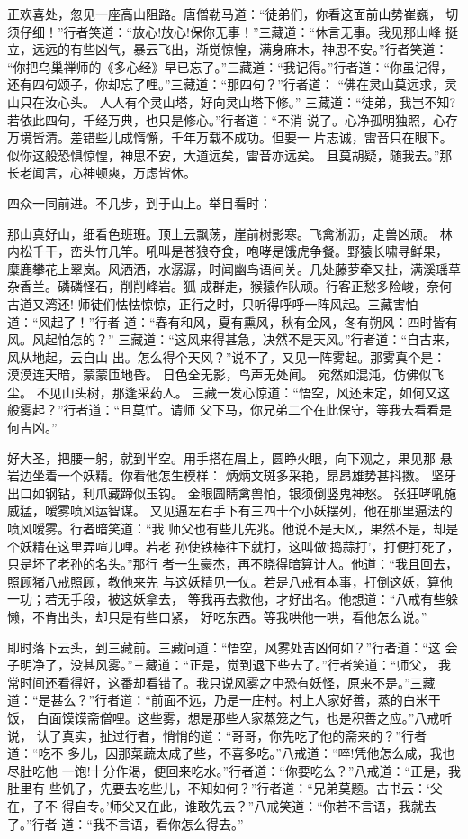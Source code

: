 正欢喜处，忽见一座高山阻路。唐僧勒马道：“徒弟们，你看这面前山势崔巍，
切须仔细！”行者笑道：“放心!放心!保你无事！”三藏道：“休言无事。我见那山峰
挺立，远远的有些凶气，暴云飞出，渐觉惊惶，满身麻木，神思不安。”行者笑道：
“你把乌巢禅师的《多心经》早已忘了。”三藏道：“我记得。”行者道：“你虽记得，
还有四句颂子，你却忘了哩。”三藏道：“那四句？”行者道：
“佛在灵山莫远求，灵山只在汝心头。
人人有个灵山塔，好向灵山塔下修。”
三藏道：“徒弟，我岂不知?若依此四句，千经万典，也只是修心。”行者道：“不消
说了。心净孤明独照，心存万境皆清。差错些儿成惰懈，千年万载不成功。但要一
片志诚，雷音只在眼下。似你这般恐惧惊惶，神思不安，大道远矣，雷音亦远矣。
且莫胡疑，随我去。”那长老闻言，心神顿爽，万虑皆休。

四众一同前进。不几步，到于山上。举目看时：

那山真好山，细看色班班。顶上云飘荡，崖前树影寒。飞禽淅沥，走兽凶顽。
林内松千干，峦头竹几竿。吼叫是苍狼夺食，咆哮是饿虎争餐。野猿长啸寻鲜果，
糜鹿攀花上翠岚。风洒洒，水潺潺，时闻幽鸟语间关。几处藤萝牵又扯，满溪瑶草
杂香兰。磷磷怪石，削削峰岩。狐成群走，猴猿作队顽。行客正愁多险峻，奈何
古道又湾还!
师徒们怯怯惊惊，正行之时，只听得呼呼一阵风起。三藏害怕道：“风起了！”行者
道：“春有和风，夏有熏风，秋有金风，冬有朔风：四时皆有风。风起怕怎的？”
三藏道：“这风来得甚急，决然不是天风。”行者道：“自古来，风从地起，云自山
出。怎么得个天风？”说不了，又见一阵雾起。那雾真个是：
漠漠连天暗，蒙蒙匝地昏。
日色全无影，鸟声无处闻。
宛然如混沌，仿佛似飞尘。
不见山头树，那逢采药人。
三藏一发心惊道：“悟空，风还未定，如何又这般雾起？”行者道：“且莫忙。请师
父下马，你兄弟二个在此保守，等我去看看是何吉凶。”

好大圣，把腰一躬，就到半空。用手搭在眉上，圆睁火眼，向下观之，果见那
悬岩边坐着一个妖精。你看他怎生模样：
炳炳文斑多采艳，昂昂雄势甚抖擞。
坚牙出口如钢钻，利爪藏蹄似玉钩。
金眼圆睛禽兽怕，银须倒竖鬼神愁。
张狂哮吼施威猛，嗳雾喷风运智谋。
又见逼左右手下有三四十个小妖摆列，他在那里逼法的喷风嗳雾。行者暗笑道：“我
师父也有些儿先兆。他说不是天风，果然不是，却是个妖精在这里弄喧儿哩。若老
孙使铁棒往下就打，这叫做‘捣蒜打’，打便打死了，只是坏了老孙的名头。”那行
者一生豪杰，再不晓得暗算计人。他道：“我且回去，照顾猪八戒照顾，教他来先
与这妖精见一仗。若是八戒有本事，打倒这妖，算他一功；若无手段，被这妖拿去，
等我再去救他，才好出名。他想道：“八戒有些躲懒，不肯出头，却只是有些口紧，
好吃东西。等我哄他一哄，看他怎么说。”

即时落下云头，到三藏前。三藏问道：“悟空，风雾处吉凶何如？”行者道：“这
会子明净了，没甚风雾。”三藏道：“正是，觉到退下些去了。”行者笑道：“师父，
我常时间还看得好，这番却看错了。我只说风雾之中恐有妖怪，原来不是。”三藏
道：“是甚么？”行者道：“前面不远，乃是一庄村。村上人家好善，蒸的白米干饭，
白面馍馍斋僧哩。这些雾，想是那些人家蒸笼之气，也是积善之应。”八戒听说，
认了真实，扯过行者，悄悄的道：“哥哥，你先吃了他的斋来的？”行者道：“吃不
多儿，因那菜蔬太咸了些，不喜多吃。”八戒道：“啐!凭他怎么咸，我也尽肚吃他
一饱!十分作渴，便回来吃水。”行者道：“你要吃么？”八戒道：“正是，我肚里有
些饥了，先要去吃些儿，不知如何？”行者道：“兄弟莫题。古书云：‘父在，子不
得自专。’师父又在此，谁敢先去？”八戒笑道：“你若不言语，我就去了。”行者
道：“我不言语，看你怎么得去。”

